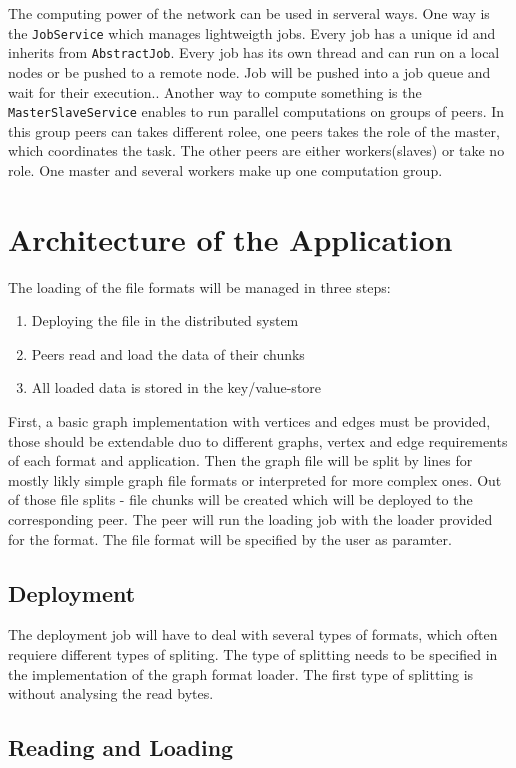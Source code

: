 The computing power of the network can be used in serveral ways. One way is the \texttt{JobService} which manages lightweigth jobs. Every job has a unique id and inherits from \texttt{AbstractJob}. Every job has its own thread and can run on a local nodes or be pushed to a remote node. Job will be pushed into a job queue and wait for their execution.. Another way to compute something is the \texttt{MasterSlaveService} enables to run parallel computations on groups of peers. In this group peers can takes different rolee, one peers takes the role of the master, which coordinates the task. The other peers are either workers(slaves) or take no role. One master and several workers make up one computation group.\cite{Beineke.20180714,dxramoverview}

\section{Architecture of the Application}
The loading of the file formats will be managed in three steps:
\begin{enumerate}
\item Deploying the file in the distributed system 
\item Peers read and load the data of their chunks
\item All loaded data is stored in the key/value-store
\end{enumerate}

First, a basic graph implementation with vertices and edges must be provided, those should be extendable duo to different graphs, vertex and edge requirements of each format and application.
Then the graph file will be split by lines for mostly likly simple graph file formats or interpreted for more complex ones. Out of those file splits - file chunks will be created which will be deployed to the corresponding peer. The peer will run the loading job with the loader provided for the format. The file format will be specified by the user as paramter.


\subsection{Deployment}
The deployment job will have to deal with several types of formats, which often requiere different types of spliting. The type of splitting needs to be specified in the implementation of the graph format loader. The first type of splitting is without analysing the read bytes. 

\subsection{Reading and Loading}

